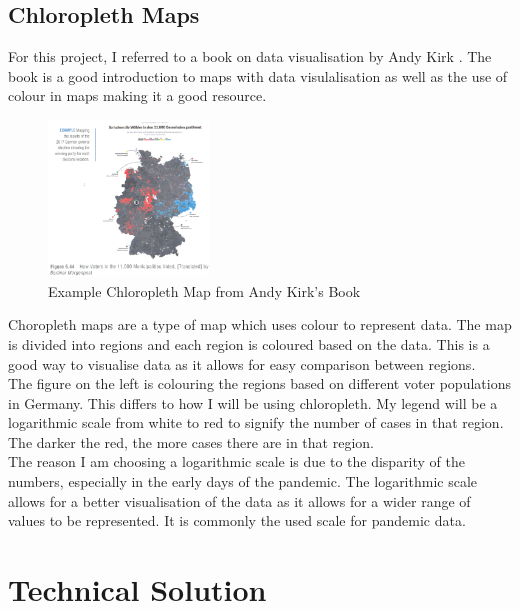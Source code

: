 \documentclass{report}
\begin{document}
\section{Chloropleth Maps}
For this project, I referred to a book on data visualisation by Andy Kirk \cite{andy2019kirk}. The book is a good introduction to maps with data visulalisation as well as the use of colour in maps making it a good resource. \\

\begin{figure}
    \begin{center}
      \includegraphics[width=0.38\textwidth]{chloropleth-example.png}
    \end{center}
    \caption{Example Chloropleth Map from Andy Kirk's Book \cite{andy2019kirk}}
  \end{figure}

Choropleth maps are a type of map which uses colour to represent data. The map is divided into regions and each region is coloured based on the data. This is a good way to visualise data as it allows for easy comparison between regions.\\

The figure on the left is colouring the regions based on different voter populations in Germany. This differs to how I will be using chloropleth. My legend will be a logarithmic scale from white to red to signify the number of cases in that region. The darker the red, the more cases there are in that region.\\

The reason I am choosing a logarithmic scale is due to the disparity of the numbers, especially in the early days of the pandemic. The logarithmic scale allows for a better visualisation of the data as it allows for a wider range of values to be represented. It is commonly the used scale for pandemic data.

\newpage
\chapter{Technical Solution}
\end{document}
